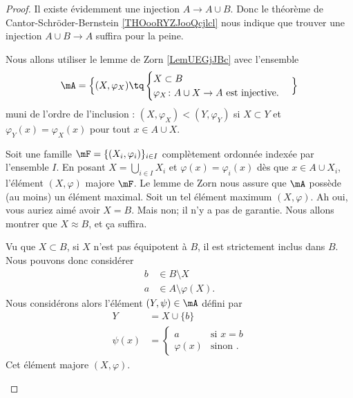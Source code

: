 \begin{proof}
	Il existe évidemment une injection \( A\to A\cup B\). Donc le théorème de Cantor-Schröder-Bernstein \ref{THOooRYZJooQcjlcl} nous indique que trouver une injection \( A\cup B\to A\) suffira pour la peine.

	Nous allons utiliser le lemme de Zorn \ref{LemUEGjJBc} avec l'ensemble
	\begin{equation}
		\mA=\Big\{  (X,\varphi_X)  \tq
		\begin{cases}
			X\subset B \\
			\varphi_X\colon A\cup X\to A\text{ est injective.}
		\end{cases}
		\Big\}
	\end{equation}
	muni de l'ordre de l'inclusion : \( (X,\varphi_X)<(Y,\varphi_Y)\) si \( X\subset Y\) et \( \varphi_Y(x)=\varphi_X(x)\) pour tout \( x\in A\cup X\).

	\begin{subproof}
		Soit une famille \( \mF=\{ (X_i,\varphi_i) \}_{i\in I}\) complètement ordonnée indexée par l'ensemble \( I\). En posant \( X=\bigcup_{i\in I}X_i\) et \( \varphi(x)=\varphi_i(x)\) dès que \( x\in A\cup X_i\), l'élément \( (X,\varphi)\) majore \( \mF\).
		\spitem[Un maximum]
		Le lemme de Zorn nous assure que \( \mA\) possède (au moins) un élément maximal. Soit un tel élément maximum \( (X,\varphi)\).
		\spitem[\( X\approx B\)]
		Ah oui, vous auriez aimé avoir \( X=B\). Mais non; il n'y a pas de garantie. Nous allons montrer que \( X\approx B\), et ça suffira.

		Vu que \( X\subset B\), si \( X\) n'est pas équipotent à \( B\), il est strictement inclus dans \( B\). Nous pouvons donc considérer
		\begin{subequations}
			\begin{align}
				b & \in B\setminus X           \\
				a & \in A\setminus \varphi(X).
			\end{align}
		\end{subequations}
		Nous considérons alors l'élément \( (Y,\psi)\in \mA\) défini par
		\begin{subequations}
			\begin{align}
				Y       & =X\cup\{ b \}                \\
				\psi(x) & =\begin{cases}
					           a          & \text{si } x=b \\
					           \varphi(x) & \text{sinon }.
				           \end{cases}
			\end{align}
		\end{subequations}
		Cet élément majore \( (X,\varphi)\).


\end{subproof}
\end{proof}
